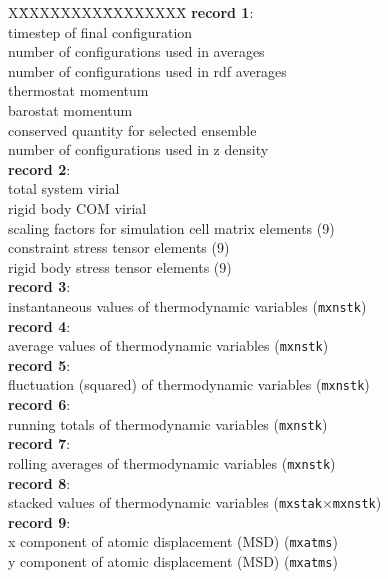 \begin{tabbing}
X\=XXXXXXXX\=XXXXXXXX\=\kill
{\bf record 1}:\\ 
 \>  timestep of final configuration\\
\>  number of configurations used in averages\\
\>  number of configurations used in rdf averages\\
\>  thermostat momentum\\
\>  barostat momentum\\
\>  conserved quantity for selected ensemble \\
\>  number of configurations used in z density\\
{\bf record 2}:\\
\> total system virial \\
\> rigid body COM virial \\
\> scaling factors for simulation cell matrix elements (9)\\
\> constraint stress tensor elements (9) \\
\> rigid body stress tensor elements (9) \\
{\bf record 3}:\\
\>  instantaneous values of thermodynamic variables
({\tt mxnstk})\\
{\bf record 4}:\\
\>  average values of thermodynamic variables
({\tt mxnstk})\\
{\bf record 5}:\\
\>  fluctuation (squared) of thermodynamic variables
({\tt mxnstk})\\
{\bf record 6}:\\
\>  running totals of thermodynamic variables
({\tt mxnstk})\\
{\bf record 7}:\\
\>  rolling averages of thermodynamic variables
({\tt mxnstk})\\
{\bf record 8}:\\
\>  stacked values of thermodynamic variables
({\tt mxstak}$\times${\tt mxnstk})\\
{\bf record 9}:\\
\> x component of atomic displacement (MSD) ({\tt mxatms})\\
\> y component of atomic displacement (MSD) ({\tt mxatms})\\

\end{tabbing}
